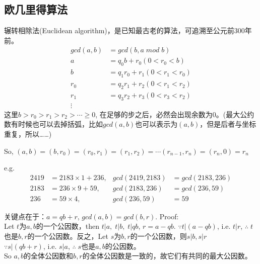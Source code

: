 \documentclass[../main.tex]{subfiles}
\begin{document}
\subsection{欧几里得算法}
辗转相除法(Euclidean algorithm)，是已知最古老的算法，可追溯至公元前300年前。
\begin{align*}
  gcd(a,b) &= gcd(b, a \; mod \; b)\\
  a&=q_0b+r_0(0<r_0<b)\\
  b&=q_1r_0+r_1(0<r_1<r_0)\\
  r_0&=q_2r_1+r_2(0<r_1<r_2)\\
  r_1&=q_3r_2+r_3(0<r_3<r_2)\\
  \vdots
\end{align*}
这里$b>r_0>r_1>r_2>\cdots \ge 0$, 在足够的步之后，必然会出现余数为0。(最大公约数有时候也可以去掉括弧，比如$gcd(a,b)$也可以表示为$(a,b)$，但是后者与坐标重复，所以……)

So, $(a,b)=(b,r_0)=(r_0,r_1)=(r_1,r_2)=\cdots (r_{n-1},r_n)=(r_n,0)=r_n$

e.g.
\begin{align*}
  2419 &=2183\times 1 + 236, &gcd(2419,2183)  &=gcd(2183,236)\\
  2183 &=236\times 9 + 59,   &gcd(2183, 236)  &=gcd(236, 59)\\
  236  &=59\times 4,         &gcd(236, 59)    &=59
\end{align*}

关键点在于：$a=qb+r$, $gcd(a,b)=gcd(b,r)$. Proof:\\
Let $t$为$a,b$的一个公因数，then $t|a,\; t|b, \;t|qb$, $r=a-qb$. $\because t|(a-qb)$, i.e.  $t|r$, $\therefore \; t$也是$b,r$的一个公因数。反之，Let $s$为$b,r$的一个公因数，则$s|b, s|r$\\
$\because s|(qb+r)$, i.e.  $s|a$, $\therefore \; s$也是$a,b$的公因数。\\
So $a,b$的全体公因数和$b,r$的全体公因数是一致的，故它们有共同的最大公因数。

\begin{center}
\end{center}
\end{document}
